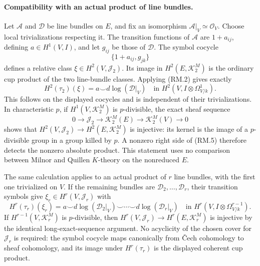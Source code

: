 \paragraph{Compatibility with an actual product of line bundles.}
Let $\mathcal A$ and $\mathcal D$ be line bundles on $E$, and fix an
isomorphism $\mathcal A|_V\simeq\mathcal O_V$. Choose local
trivializations respecting it. The transition functions of
$\mathcal A$ are $1+a_{ij}$, defining $a\in H^1(V,I)$, and let
$g_{ij}$ be those of $\mathcal D$. The symbol cocycle
\[
       \{1+a_{ij},g_{jk}\}
\]
defines a relative class $\xi\in H^2(V,\mathcal J_2)$. Its image
in $H^2(E,\mathcal K_2^M)$ is the ordinary cup product of the two
line-bundle classes. Applying (RM.2) gives exactly
\[
 H^2(\tau_2)(\xi)
       =a\smile d\log(\mathcal D|_V)
            \quad\text{in }H^2(V,I\otimes\Omega^1_{V/k}).
 \tag{RM.5}
\]
This follows on the displayed cocycles and is independent of their
trivializations. In characteristic $p$, if
$H^1(V,\mathcal K_2^M)$ is $p$-divisible, the exact sheaf sequence
\[
 0\longrightarrow\mathcal J_2\longrightarrow\mathcal K_2^M(E)
       \longrightarrow\mathcal K_2^M(V)\longrightarrow0
\]
shows that $H^2(V,\mathcal J_2)\to H^2(E,\mathcal K_2^M)$ is
injective: its kernel is the image of a $p$-divisible group in a
group killed by $p$. A nonzero right side of (RM.5) therefore detects
the nonzero absolute product. This statement uses no comparison
between Milnor and Quillen $K$-theory on the nonreduced $E$.

The same calculation applies to an actual product of $r$ line
bundles, with the first one trivialized on $V$. If the remaining
bundles are $\mathcal D_2,\ldots,\mathcal D_r$, their transition
symbols give $\xi_r\in H^r(V,\mathcal J_r)$ with
\[
 H^r(\tau_r)(\xi_r)=
 a\smile d\log(\mathcal D_2|_V)\smile\cdots\smile
              d\log(\mathcal D_r|_V)
 \quad\text{in }H^r(V,I\otimes\Omega^{r-1}_{V/k}).
 \tag{RM.7}
\]
If $H^{r-1}(V,\mathcal K_r^M)$ is $p$-divisible, then
$H^r(V,\mathcal J_r)\to H^r(E,\mathcal K_r^M)$ is injective
by the identical long-exact-sequence argument. No acyclicity of
the chosen cover for $\mathcal J_r$ is required: the symbol cocycle
maps canonically from \v Cech cohomology to sheaf cohomology, and
its image under $H^r(\tau_r)$ is the displayed coherent cup product.

